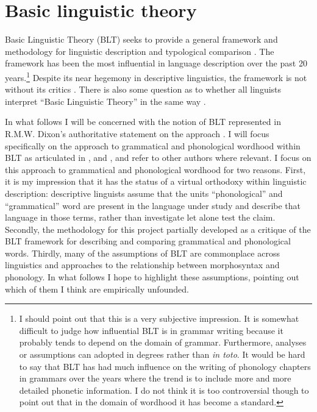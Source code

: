 \documentclass[output=paper,hidelinks]{langscibook}
\begin{document}
\section{Basic linguistic theory}
\label{sec:blt}
\largerpage
Basic Linguistic Theory (BLT) seeks to provide a general framework and methodology for linguistic description and typological comparison \citep{dixon1997rise, dixon2010basic}. The framework has been the most influential in language description over the past 20 years.\footnote{I should point out that this is a very subjective impression. It is somewhat difficult to judge how influential BLT is in grammar writing because it probably tends to depend on the domain of grammar. Furthermore, analyses or assumptions can adopted in degrees rather than \textit{in toto}. It would be hard to say that BLT has had much influence on the writing of phonology chapters in grammars over the years where the trend is to include more and more detailed phonetic information. I do not think it is too controversial though to point out that in the domain of wordhood it has become a standard.}  Despite its near hegemony in descriptive linguistics, the framework is not without its critics \citep{mcgregor2021neo}. There is also some question as to whether all linguists interpret ``Basic Linguistic Theory'' in the same way \citep{haspelmath2008oxford}.

In what follows I will be concerned with the notion of BLT represented in R.M.W. Dixon's authoritative statement on the approach \citep{dixon2010basic, dixon2010basica}. I will focus specifically on the approach to grammatical and phonological wordhood within BLT as articulated in \citet{dixonaikhenvald02}, \citet{dixon2010basica} and \citet{aikhenvald2020essence}, and refer to other authors where relevant. I focus on this approach to grammatical and phonological wordhood for two reasons. First, it is my impression that it has the status of a virtual orthodoxy within linguistic description: descriptive linguists assume that the units ``phonological'' and ``grammatical'' word are present in the language under study and describe that language in those terms, rather than investigate let alone test the claim. Secondly, the methodology for this project partially developed as a critique of the BLT framework for describing and comparing grammatical and phonological words. Thirdly, many of the assumptions of BLT are commonplace across linguistics and approaches to the relationship between morphosyntax and phonology. In what follows I hope to highlight these assumptions, pointing out which of them I think are empirically unfounded.
\end{document}
